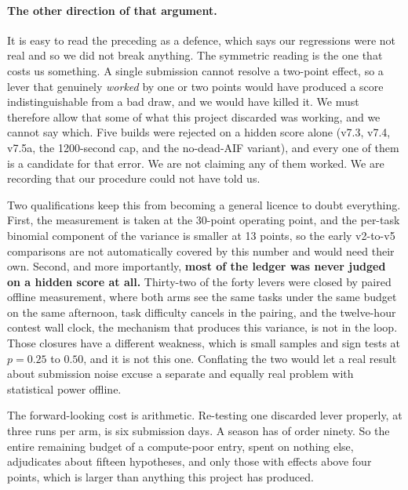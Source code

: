 \documentclass[11pt]{article}
\begin{document}
\paragraph{The other direction of that argument.}
It is easy to read the preceding as a defence, which says our regressions were not real and so we did not break
anything. The symmetric reading is the one that costs us something. A single submission cannot
resolve a two-point effect, so a lever that genuinely \emph{worked} by one or two points would have
produced a score indistinguishable from a bad draw, and we would have killed it. We must therefore
allow that some of what this project discarded was working, and we cannot say which. Five builds were
rejected on a hidden score alone (v7.3, v7.4, v7.5a, the 1200-second cap, and the no-dead-AIF
variant), and every one of them is a candidate for that error. We are not claiming any of them
worked. We are recording that our procedure could not have told us.

Two qualifications keep this from becoming a general licence to doubt everything. First, the
measurement is taken at the 30-point operating point, and the per-task binomial component of the
variance is smaller at 13 points, so the early v2-to-v5 comparisons are not automatically covered by
this number and would need their own. Second, and more importantly, \textbf{most of the ledger was
never judged on a hidden score at all.} Thirty-two of the forty levers were closed by paired
offline measurement, where both arms see the same tasks under the same budget on the same afternoon,
task difficulty cancels in the pairing, and the twelve-hour contest wall clock, the mechanism that
produces this variance, is not in the loop. Those closures have a different weakness, which is
small samples and sign tests at $p = 0.25$ to $0.50$, and it is not this one. Conflating the two
would let a real result about submission noise excuse a separate and equally real problem with
statistical power offline.

The forward-looking cost is arithmetic. Re-testing one discarded lever properly, at three runs per
arm, is six submission days. A season has of order ninety. So the entire remaining budget of a
compute-poor entry, spent on nothing else, adjudicates about fifteen hypotheses, and only those
with effects above four points, which is larger than anything this project has produced.
\end{document}
